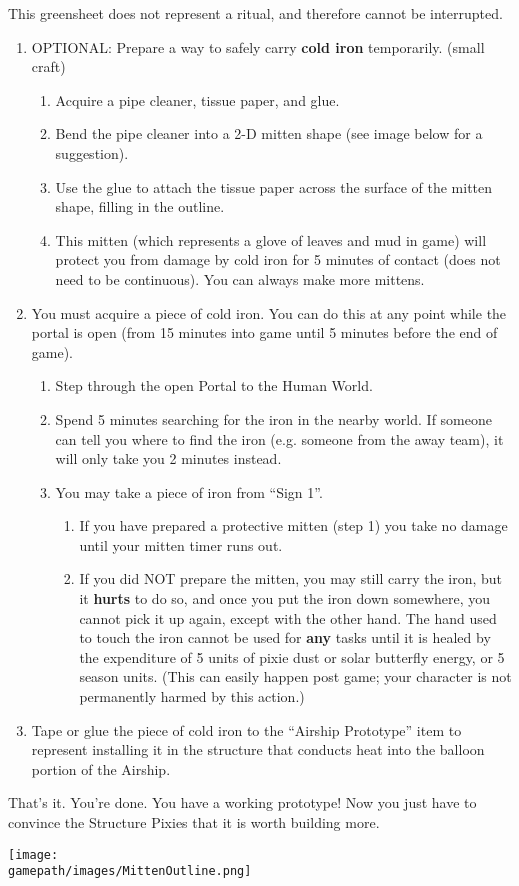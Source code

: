 \documentclass[green]{PP}
\begin{document}
\name{\gAirship{}}
This greensheet does not represent a ritual, and therefore cannot be interrupted.

\begin{enumerate}
	\item OPTIONAL: Prepare a way to safely carry \textbf{cold iron} temporarily. (small craft)
	\begin{enumerate}
		\item Acquire a pipe cleaner, tissue paper, and glue.
		\item Bend the pipe cleaner into a 2-D mitten shape (see image below for a suggestion).
		\item Use the glue to attach the tissue paper across the surface of the mitten shape, filling in the outline.
		\item This mitten (which represents a glove of leaves and mud in game) will protect you from damage by cold iron for 5 minutes of contact (does not need to be continuous). You can always make more mittens.
	\end{enumerate}
	\item You must acquire a piece of cold iron. You can do this at any point while the portal is open (from 15 minutes into game until 5 minutes before the end of game).
	\begin{enumerate}
		\item Step through the open Portal to the Human World.
		\item Spend 5 minutes searching for the iron in the nearby world. If someone can tell you where to find the iron (e.g. someone from the away team), it will only take you 2 minutes instead.
		\item You may take a piece of iron from “Sign 1”.
		\begin{enumerate}
			\item If you have prepared a protective mitten (step 1) you take no damage until your mitten timer runs out.
			\item If you did NOT prepare the mitten, you may still carry the iron, but it \textbf{hurts} to do so, and once you put the iron down somewhere, you cannot pick it up again, except with the other hand. The hand used to touch the iron cannot be used for \textbf{any} tasks until it is healed by the expenditure of 5 units of pixie dust or solar butterfly energy, or 5 season units. (This can easily happen post game; your character is not permanently harmed by this action.)
		\end{enumerate}
	\end{enumerate}
	\item Tape or glue the piece of cold iron to the “Airship Prototype” item to represent installing it in the structure that conducts heat into the balloon portion of the Airship.
\end{enumerate}

That’s it. You’re done. You have a working prototype! Now you just have to convince the Structure Pixies that it is worth building more.

\texttt{[image: \\gamepath/images/MittenOutline.png]}
\end{document}
